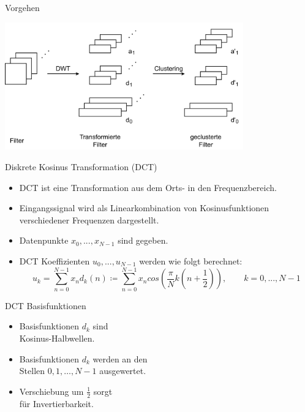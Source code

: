 \documentclass[aspectratio=169, 12pt]{beamer}
\begin{document}
\begin{frame}{Vorgehen}
  \vspace{-0.8cm}
  \begin{center}
    \includegraphics[height=5.5cm]{images/Vorgehen2.pdf}
  \end{center}
\end{frame}

\begin{frame}{Diskrete Kosinus Transformation (DCT)}
  \begin{itemize}
    \item DCT ist eine Transformation aus dem Orts- in den Frequenzbereich.
    \item Eingangssignal wird als Linearkombination von Kosinusfunktionen verschiedener Frequenzen dargestellt.
    \item Datenpunkte $x_0, ..., x_{N-1}$ sind gegeben.
    \item DCT Koeffizienten $u_0, ..., u_{N-1}$ werden wie folgt berechnet:
          \begin{equation*}
            u_k = \sum_{n=0}^{N-1} x_n d_k(n) \coloneqq \sum_{n=0}^{N-1} x_n cos\left( \frac{\pi}{N} k \left( n + \frac{1}{2} \right) \right), \qquad k = 0, ..., N-1
          \end{equation*}
  \end{itemize}
\end{frame}

\begin{frame}{DCT Basisfunktionen}
  \begin{figure}
    \vspace{-1.2cm}
    \resizebox{7.5cm}{!}{%
      
    }
  \end{figure}
  \leavevmode
  \begin{itemize}
    \item Basisfunktionen $d_k$ sind \\ Kosinus-Halbwellen.
    \item Basisfunktionen $d_k$ werden an den \\ Stellen $0, 1, \ldots , N-1$ ausgewertet.
    \item Verschiebung um $\frac{1}{2}$ sorgt \\ für Invertierbarkeit.
  \end{itemize}
\end{frame}
\end{document}
